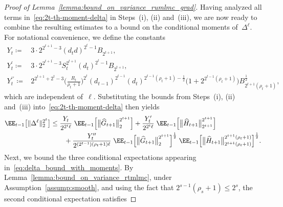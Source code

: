 \documentclass[11pt]{article}
\let\hat\widehat
\begin{document}
\begin{proof}[Proof of Lemma~\ref{lemma:bound_on_variance_rumlmc_grad}]
Having analyzed all terms in~\eqref{eq:2t-th-moment-delta} in Steps~(i), (ii) and~(iii), we are now ready to combine the resulting estimates to a bound on the conditional moments of~$\Delta^\ell$. For notational convenience, we define the constants
\begin{equation*}
\begin{aligned}
    Y_t \coloneqq & 3 \cdot 2^{2^{t+1}-3}(d_t d)^{2^t-1} B_{2^{t+1}},\\
    Y^{\prime}_t \coloneqq & 3 \cdot 2^{2^{t+1}-3}  S_t^{2^{t+1}} (d_t)^{2^t-1}B_{2^{t+1}},\\
    Y^{\prime\prime}_t \coloneqq & 2^{2^{t+1}+2^t-3}\Big(\frac{R_t}{\rho_t+1}\Big)^{2^t} (d_{t-1})^{2^{t-1}} (d_t)^{2^{t-1}(\rho_t+1)-\frac{1}{2}}  \Big(1 + 2^{2^{t-1}(\rho_t+1)}\Big)  B_{2^{t+1}(\rho_t+1)}^\frac{1}{2},
\end{aligned}
\end{equation*}
which are independent of~$\ell$. Substituting the bounds from Steps~(i), (ii) and~(iii) into~\eqref{eq:2t-th-moment-delta} then yields
\begin{equation}\label{eq:delta_bound_with_moments}
    \begin{aligned}
    \EE_{t-1}\big[\|\Delta^\ell \|_{2}^{2^t}\big]
    & \leq  \frac{Y_t}{2^{2^{t}\ell}} \; \EE_{t-1}\Big[\big\|\hat{G}_{t+1}\big\|_{2}^{2^{t+1}}\Big] 
    + \frac{Y_t^\prime}{2^{2^{t}\ell}} \;  \EE_{t-1}\Big[\big\|\hat{H}_{t+1}\big\|_{2^{t+1}}^{2^{t+1}}\Big] \\
    &\qquad + \frac{Y_t^{\prime\prime}}{2^{(2^{t-1})(\rho_t+1)\ell}} \; \EE_{t-1}\Big[\big\| \hat{G}_{t+1} \big\|_{2}^{2^{t+1}}\Big]^\frac{1}{2} \; \EE_{t-1}\Big[\big\|\hat{H}_{t+1}\big\|_{2^{t+1}(\rho_t+1)}^{2^{t+1}(\rho_t+1)}\Big]^\frac{1}{2}.
\end{aligned}
\end{equation}
Next, we bound the three conditional expectations appearing in~\eqref{eq:delta_bound_with_moments}. By Lemma~\ref{lemma:bound_on_variance_rtmlmc}, under Assumption~\ref{assump:smooth}, and using the fact that $2^{s-1}(\rho_s+1)\leq 2^{s}$, the second conditional expectation satisfies


\end{proof}
\end{document}
